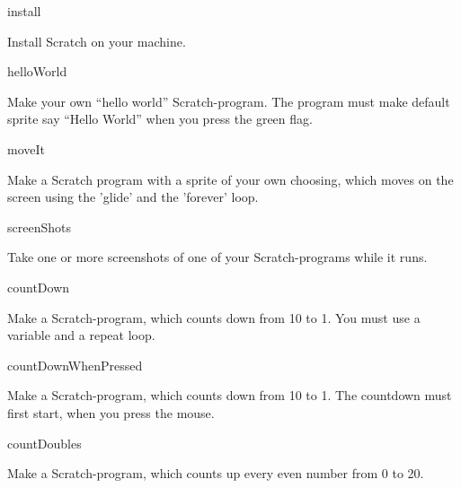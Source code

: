 \begin{defproblem}{install}
  \begin{onlyproblem}
    Install Scratch on your machine.
  \end{onlyproblem}
\end{defproblem}

\begin{defproblem}{helloWorld}
  \begin{onlyproblem}
    Make your own ``hello world'' Scratch-program. The program must make
    default sprite say ``Hello World'' when you press the green flag.
  \end{onlyproblem}
\end{defproblem}

\begin{defproblem}{moveIt}
  \begin{onlyproblem}
    Make a Scratch program with a sprite of your own choosing, which
    moves on the screen using the 'glide' and the 'forever' loop.
  \end{onlyproblem}
\end{defproblem}

\begin{defproblem}{screenShots}
  \begin{onlyproblem}
    Take one or more screenshots of one of your Scratch-programs while it runs.
  \end{onlyproblem}
\end{defproblem}

\begin{defproblem}{countDown}
  \begin{onlyproblem}
    Make a Scratch-program, which counts down from 10 to 1. You must use a
    variable and a repeat loop.
  \end{onlyproblem}
\end{defproblem}

\begin{defproblem}{countDownWhenPressed}
  \begin{onlyproblem}
    Make a Scratch-program, which counts down from 10 to 1. The countdown must
    first start, when you press the mouse.
  \end{onlyproblem}
\end{defproblem}

\begin{defproblem}{countDoubles}
  \begin{onlyproblem}
    Make a Scratch-program, which counts up every even number from 0 to 20.
  \end{onlyproblem}
\end{defproblem}

